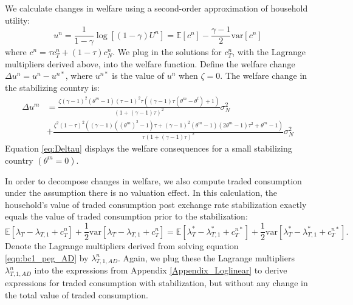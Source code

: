 We calculate changes in welfare using a second-order approximation of
household utility:
\begin{equation}
  u^n = \frac{1}{1 - \gamma}\log \left[ (1 - \gamma) U^n \right] = 
  \mathbb{E}[c^n] - \frac{\gamma - 1}{2} \text{var} [c^n]
  \label{eqn:utility_approx}
\end{equation}
where $c^n = \tau c^n_T + (1 - \tau) c^n_N$. We plug in the solutions
for $c^n_T$, with the Lagrange multipliers derived above, into the
welfare function. Define the welfare change
$\Delta u^n = u^n - u^{n \ast}$, where $u^{n \ast}$ is the value of
$u^n$ when $\zeta = 0$. The welfare change in the stabilizing country
is:
\begin{equation*}
  \begin{split}
    \Delta u^m & = \frac{ \zeta (\gamma -1)^2 (\theta^m - 1) (\tau
      -1)^2 \tau ((\gamma -1) \tau (\theta^m - \theta^t) + 1)
    }{(1 + (\gamma -1) \tau)^2} \sigma_N^2 \\
    & + \frac{ \zeta^2 (1 - \tau)^2 \left( (\gamma -1) \left(\left(
            \theta^m \right)^2 - 1\right) \tau + (\gamma - 1)^2
        (\theta^m - 1) (2 \theta^m - 1) \tau^2 + \theta^m - 1 \right)
    }{\tau (1 + (\gamma - 1) \tau)^2} \sigma_N^2
  \end{split}
\end{equation*}
Equation \eqref{eq:Deltau} displays the welfare consequences for a
small stabilizing country $\left( \theta^m = 0 \right)$.

In order to decompose changes in welfare, we also compute traded
consumption under the assumption there is no valuation effect. In this
calculation, the household's value of traded consumption post exchange
rate stabilization exactly equals the value of traded consumption
prior to the stabilization:
\begin{equation}
  \mathbb{E} \left[ \lambda_T - \lambda_{T, 1} + c^n_T \right] +
  \frac{1}{2} \text {var} \left[ \lambda_T - \lambda_{T, 1} + c^n_T
  \right]
  = \mathbb{E} \left[
    \lambda^{\ast}_T - \lambda^{\ast}_{T, 1} + c^{n \ast}_T
  \right]
  + \frac{1}{2} \text {var} \left[
    \lambda^{\ast}_T - \lambda^{\ast}_{T, 1} + c^{n \ast}_T
  \right].
  \label{eqn:bc1_peg_AD}
\end{equation}
Denote the Lagrange multipliers derived from solving equation
\eqref{eqn:bc1_peg_AD} by $\lambda^n_{T, 1, AD}$. Again, we plug these
the Lagrange multipliers $\lambda^n_{T, 1, AD}$ into the expressions
from Appendix \ref{Appendix_Loglinear} to derive expressions for
traded consumption with stabilization, but without any change in the
total value of traded consumption.

